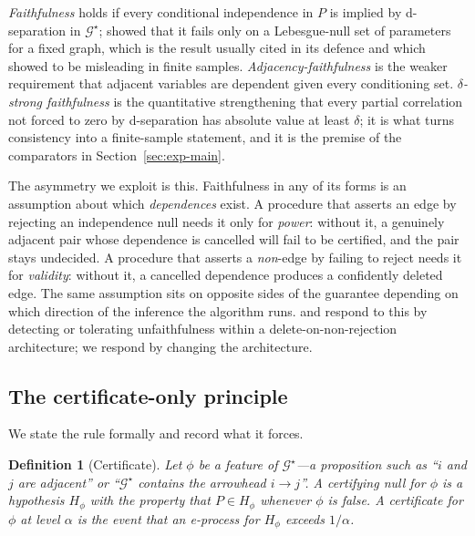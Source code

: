 \documentclass[pdflatex,sn-apa]{sn-jnl}
\theoremstyle{thmstyleone}%
\theoremstyle{thmstyletwo}%
\theoremstyle{thmstylethree}%
\newtheorem{definition}{Definition}%
\newcommand{\Gstar}{\mathcal{G}^{\star}}
\begin{document}
\emph{Faithfulness} holds if every conditional independence in $P$ is implied
by d-separation in $\Gstar$; \citet{meek1995strong} showed that it fails only
on a Lebesgue-null set of parameters for a fixed graph, which is the result
usually cited in its defence and which \citet{uhler2013geometry} showed to be
misleading in finite samples. \emph{Adjacency-faithfulness}
\citep{ramsey2006adjacency} is the weaker requirement that adjacent variables
are dependent given every conditioning set. \emph{$\delta$-strong
faithfulness} \citep{uhler2013geometry,kalisch2007estimating} is the
quantitative strengthening that every partial correlation not forced to zero
by d-separation has absolute value at least $\delta$; it is what turns
consistency into a finite-sample statement, and it is the premise of the
comparators in Section~\ref{sec:exp-main}.

The asymmetry we exploit is this. Faithfulness in any of its forms is an
assumption about which \emph{dependences} exist. A procedure that asserts an
edge by rejecting an independence null needs it only for \emph{power}: without
it, a genuinely adjacent pair whose dependence is cancelled will fail to be
certified, and the pair stays undecided. A procedure that asserts a
\emph{non}-edge by failing to reject needs it for \emph{validity}: without it,
a cancelled dependence produces a confidently deleted edge. The same
assumption sits on opposite sides of the guarantee depending on which
direction of the inference the algorithm runs. \citet{zhang2008detection} and
\citet{ramsey2006adjacency} respond to this by detecting or tolerating
unfaithfulness within a delete-on-non-rejection architecture; we respond by
changing the architecture.

\subsection{The certificate-only principle}\label{sec:principle}

We state the rule formally and record what it forces.

\begin{definition}[Certificate]\label{def:cert}
Let $\phi$ be a feature of $\Gstar$---a proposition such as ``$i$ and $j$ are
adjacent'' or ``$\Gstar$ contains the arrowhead $i \to j$''. A
\emph{certifying null} for $\phi$ is a hypothesis $H_\phi$ with the property
that $P \in H_\phi$ whenever $\phi$ is false. A \emph{certificate for $\phi$
at level $\alpha$} is the event that an e-process for $H_\phi$ exceeds
$1/\alpha$.
\end{definition}
\end{document}
